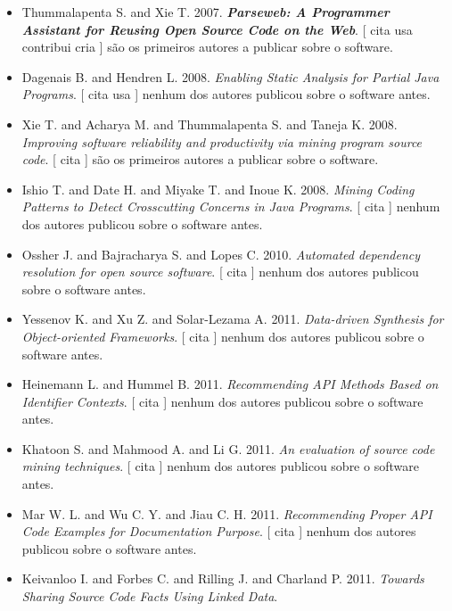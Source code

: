 \begin{itemize}
\item Thummalapenta S. and Xie T.
      2007.
        \textbf{\textit{ Parseweb: A Programmer Assistant for Reusing Open Source Code on the Web}}.
      [
          cita
          usa
          contribui
          cria
      ]
são os primeiros autores a publicar sobre o software.
\item Dagenais B. and Hendren L.
      2008.
        \textit{ Enabling Static Analysis for Partial Java Programs}.
      [
          cita
          usa
      ]
nenhum dos autores publicou sobre o software antes.
\item Xie T. and Acharya M. and Thummalapenta S. and Taneja K.
      2008.
        \textit{ Improving software reliability and productivity via mining program source code}.
      [
          cita
      ]
são os primeiros autores a publicar sobre o software.
\item Ishio T. and Date H. and Miyake T. and Inoue K.
      2008.
        \textit{ Mining Coding Patterns to Detect Crosscutting Concerns in Java Programs}.
      [
          cita
      ]
nenhum dos autores publicou sobre o software antes.
\item Ossher J. and Bajracharya S. and Lopes C.
      2010.
        \textit{ Automated dependency resolution for open source software}.
      [
          cita
      ]
nenhum dos autores publicou sobre o software antes.
\item Yessenov K. and Xu Z. and Solar-Lezama A.
      2011.
        \textit{ Data-driven Synthesis for Object-oriented Frameworks}.
      [
          cita
      ]
nenhum dos autores publicou sobre o software antes.
\item Heinemann L. and Hummel B.
      2011.
        \textit{ Recommending API Methods Based on Identifier Contexts}.
      [
          cita
      ]
nenhum dos autores publicou sobre o software antes.
\item Khatoon S. and Mahmood A. and Li G.
      2011.
        \textit{ An evaluation of source code mining techniques}.
      [
          cita
      ]
nenhum dos autores publicou sobre o software antes.
\item Mar W. L. and Wu C. Y. and Jiau C. H.
      2011.
        \textit{ Recommending Proper API Code Examples for Documentation Purpose}.
      [
          cita
      ]
nenhum dos autores publicou sobre o software antes.
\item Keivanloo I. and Forbes C. and Rilling J. and Charland P.
      2011.
        \textit{ Towards Sharing Source Code Facts Using Linked Data}.

\end{itemize}
